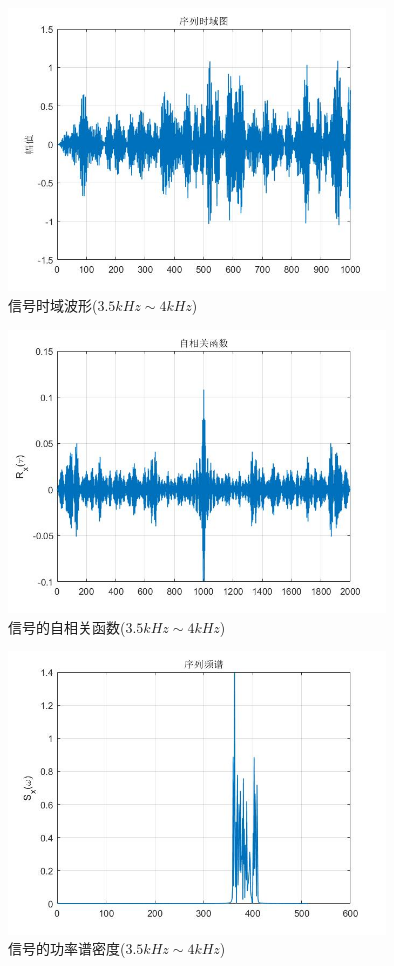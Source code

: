 \documentclass[UTF-8, a4paper, 12pt]{ctexart}
\begin{document}
\begin{figure}[htbp]
    \centering
    \includegraphics[width=10cm]{figs/f42.jpg}
    \caption{信号时域波形($3.5kHz\sim 4kHz$)}
    \label{f42}
\end{figure}
\begin{figure}[htbp]
    \centering
    \includegraphics[width=10cm]{figs/f43.jpg}
    \caption{信号的自相关函数($3.5kHz\sim 4kHz$)}
\end{figure}
\begin{figure}[htbp]
    \centering
    \includegraphics[width=10cm]{figs/f44.jpg}
    \caption{信号的功率谱密度($3.5kHz\sim 4kHz$)}
\end{figure}\newpage
\end{document}
